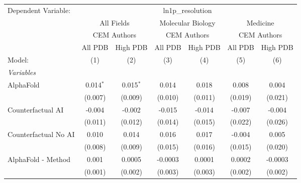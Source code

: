 \begingroup
\centering
\begin{tabular}{lcccccc}
   \tabularnewline \midrule \midrule
   Dependent Variable: & \multicolumn{6}{c}{ln1p\_resolution}\\
 & \multicolumn{2}{c}{All Fields} & \multicolumn{2}{c}{Molecular Biology} & \multicolumn{2}{c}{Medicine} \\
\cmidrule(lr){2-3} \cmidrule(lr){4-5} \cmidrule(lr){6-7}
 & \multicolumn{2}{c}{CEM Authors} & \multicolumn{2}{c}{CEM Authors} & \multicolumn{2}{c}{CEM Authors} \\
\cmidrule(lr){2-3} \cmidrule(lr){4-5} \cmidrule(lr){6-7}
 & \multicolumn{1}{c}{All PDB} & \multicolumn{1}{c}{High PDB} & \multicolumn{1}{c}{All PDB} & \multicolumn{1}{c}{High PDB} & \multicolumn{1}{c}{All PDB} & \multicolumn{1}{c}{High PDB} \\
\cmidrule(lr){2-2} \cmidrule(lr){3-3} \cmidrule(lr){4-4} \cmidrule(lr){5-5} \cmidrule(lr){6-6} \cmidrule(lr){7-7}
   Model:                                                     & (1)           & (2)           & (3)          & (4)          & (5)          & (6)\\  
   \midrule
   \emph{Variables}\\
   AlphaFold                                                  & 0.014$^{*}$   & 0.015$^{*}$   & 0.014        & 0.018        & 0.008        & 0.004\\   
                                                              & (0.007)       & (0.009)       & (0.010)      & (0.011)      & (0.019)      & (0.021)\\   
   Counterfactual AI                                          & -0.004        & -0.002        & -0.015       & -0.014       & -0.007       & -0.004\\   
                                                              & (0.011)       & (0.012)       & (0.014)      & (0.015)      & (0.022)      & (0.026)\\   
   Counterfactual No AI                                       & 0.010         & 0.014         & 0.016        & 0.017        & -0.004       & 0.005\\   
                                                              & (0.008)       & (0.009)       & (0.015)      & (0.016)      & (0.015)      & (0.020)\\   
   AlphaFold - Method                                         & 0.001         & 0.0005        & -0.0003      & 0.0001       & 0.0002       & -0.0003\\   
                                                              & (0.001)       & (0.002)       & (0.003)      & (0.003)      & (0.002)      & (0.002)\\   

\end{tabular}
